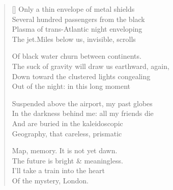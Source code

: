\label{ch:flight}
\settowidth{\versewidth}{The suck of gravity will draw us earthward, again,}
\begin{verse}[\versewidth]
Only a thin envelope of metal shields\\
Several hundred passengers from the black\\
Plasma of trans-Atlantic night enveloping\\
The jet.\quad Miles below us, invisible, scrolls

Of black water churn between continents.\\
The suck of gravity will draw us earthward, again,\\
Down toward the clustered lights congealing\\
Out of the night: in this long moment

Suspended above the airport, my past globes\\
In the darkness behind me: all my friends die\\
And are buried in the kaleidoscopic\\
Geography, that careless, prismatic

Map, memory. \hspace*{1\vgap} It is not yet dawn.\\
The future is bright \& meaningless.\\
I'll take a train into the heart\\
\hspace*{1\vgap} Of the mystery, London.
\end{verse}
